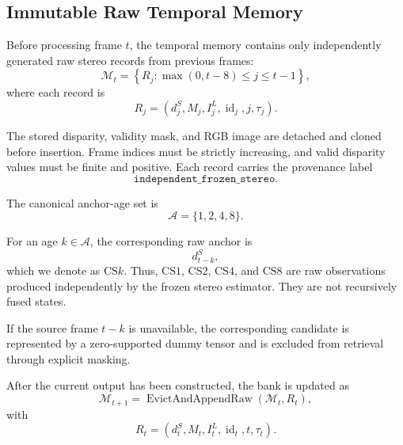 \documentclass[11pt,a4paper]{article}
\begin{document}
\subsection{Immutable Raw Temporal Memory}
\label{sec:raw_memory}

Before processing frame \(t\), the temporal memory contains only
independently generated raw stereo records from previous frames:
%
\begin{equation}
\mathcal{M}_t
=
\left\{
R_j:
\max(0,t-8)\leq j\leq t-1
\right\},
\label{eq:memory_before_inference}
\end{equation}
%
where each record is
%
\begin{equation}
R_j
=
\left(
d_j^S,
M_j,
I_j^L,
\operatorname{id}_j,
j,
\tau_j
\right).
\label{eq:memory_record}
\end{equation}

The stored disparity, validity mask, and RGB image are detached and
cloned before insertion. Frame indices must be strictly increasing, and
valid disparity values must be finite and positive. Each record carries
the provenance label
%
\begin{equation}
\texttt{independent\_frozen\_stereo}.
\end{equation}

The canonical anchor-age set is
%
\begin{equation}
\mathcal{A}
=
\{1,2,4,8\}.
\label{eq:anchor_ages}
\end{equation}

For an age \(k\in\mathcal{A}\), the corresponding raw anchor is
%
\begin{equation}
d_{t-k}^S,
\end{equation}
%
which we denote as \(\mathrm{CS}k\). Thus, \(\mathrm{CS1}\),
\(\mathrm{CS2}\), \(\mathrm{CS4}\), and \(\mathrm{CS8}\) are raw
observations produced independently by the frozen stereo estimator.
They are not recursively fused states.

If the source frame \(t-k\) is unavailable, the corresponding candidate
is represented by a zero-supported dummy tensor and is excluded from
retrieval through explicit masking.

After the current output has been constructed, the bank is updated as
%
\begin{equation}
\mathcal{M}_{t+1}
=
\operatorname{EvictAndAppendRaw}
\left(
\mathcal{M}_t,
R_t
\right),
\label{eq:raw_memory_update}
\end{equation}
%
with
%
\begin{equation}
R_t
=
\left(
d_t^S,
M_t,
I_t^L,
\operatorname{id}_t,
t,
\tau_t
\right).
\end{equation}
\end{document}
